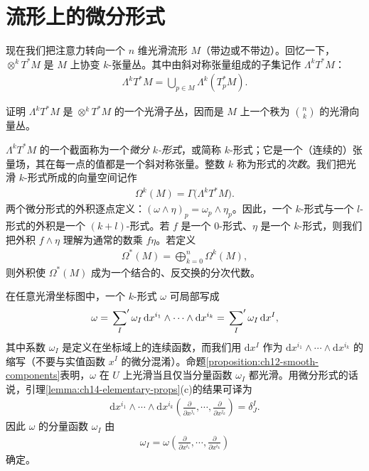 \documentclass[../../main.tex]{subfiles}
\begin{document}
\section{流形上的微分形式}\label{section:ch14-differential-forms-manifolds}

现在我们把注意力转向一个 $n$ 维光滑流形 $M$（带边或不带边）。回忆一下，$\otimes^k T^*M$ 是 $M$ 上协变 $k$-张量丛。其中由斜对称张量组成的子集记作 $\Lambda^k T^*M$：
\begin{align*}
\Lambda^k T^*M=\bigcup_{p\in M}\Lambda^k(T^*_pM).
\end{align*}

\begin{exercise}\label{exercise:ch14-14}
证明 $\Lambda^k T^*M$ 是 $\otimes^k T^*M$ 的一个光滑子丛，因而是 $M$ 上一个秩为 $\binom{n}{k}$ 的光滑向量丛。
\end{exercise}

$\Lambda^k T^*M$ 的一个截面称为一个\emph{微分 $k$-形式}，或简称 $k$-形式；它是一个（连续的）张量场，其在每一点的值都是一个斜对称张量。整数 $k$ 称为形式的\emph{次数}。我们把光滑 $k$-形式所成的向量空间记作
\begin{align*}
\Omega^k(M)=\Gamma\bigl(\Lambda^k T^*M\bigr).
\end{align*}
两个微分形式的外积逐点定义：$(\omega\wedge\eta)_p=\omega_p\wedge\eta_p$。因此，一个 $k$-形式与一个 $l$-形式的外积是一个 $(k+l)$-形式。若 $f$ 是一个 $0$-形式、$\eta$ 是一个 $k$-形式，则我们把外积 $f\wedge\eta$ 理解为通常的数乘 $f\eta$。若定义
\begin{align}
\Omega^*(M)=\bigoplus_{k=0}^n\Omega^k(M),\label{align:ch14-omega-algebra}
\end{align}
则外积使 $\Omega^*(M)$ 成为一个结合的、反交换的分次代数。

在任意光滑坐标图中，一个 $k$-形式 $\omega$ 可局部写成
\begin{align*}
\omega=\sideset{}{'}\sum_I\omega_I\,\mathrm{d}x^{i_1}\wedge\cdots\wedge\mathrm{d}x^{i_k}
=\sideset{}{'}\sum_I\omega_I\,\mathrm{d}x^I,
\end{align*}
其中系数 $\omega_I$ 是定义在坐标域上的连续函数，而我们用 $\mathrm{d}x^I$ 作为 $\mathrm{d}x^{i_1}\wedge\cdots\wedge\mathrm{d}x^{i_k}$ 的缩写（不要与实值函数 $x^I$ 的微分混淆）。命题\ref{proposition:ch12-smooth-components}表明，$\omega$ 在 $U$ 上光滑当且仅当分量函数 $\omega_I$ 都光滑。用微分形式的话说，引理\ref{lemma:ch14-elementary-props}(c)的结果可译为
\begin{align*}
\mathrm{d}x^{i_1}\wedge\cdots\wedge\mathrm{d}x^{i_k}
\left(\frac{\partial}{\partial x^{j_1}},\cdots ,\frac{\partial}{\partial x^{j_k}}\right)
=\delta^I_J.
\end{align*}
因此 $\omega$ 的分量函数 $\omega_I$ 由
\begin{align*}
\omega_I=\omega\left(\frac{\partial}{\partial x^{i_1}},\cdots ,\frac{\partial}{\partial x^{i_k}}\right)
\end{align*}
确定。
\end{document}
